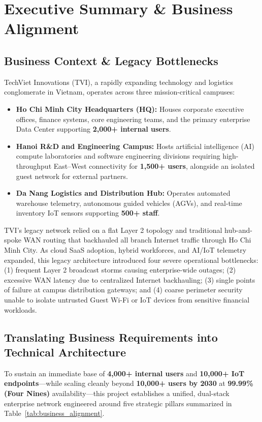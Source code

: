\section{Executive Summary \& Business Alignment}

\subsection{Business Context \& Legacy Bottlenecks}
TechViet Innovations (TVI), a rapidly expanding technology and logistics conglomerate in Vietnam, operates across three mission-critical campuses:
\begin{itemize}[leftmargin=1.5em, itemsep=3pt]
    \item \textbf{Ho Chi Minh City Headquarters (HQ):} Houses corporate executive offices, finance systems, core engineering teams, and the primary enterprise Data Center supporting \textbf{2,000+ internal users}.
    \item \textbf{Hanoi R\&D and Engineering Campus:} Hosts artificial intelligence (AI) compute laboratories and software engineering divisions requiring high-throughput East--West connectivity for \textbf{1,500+ users}, alongside an isolated guest network for external partners.
    \item \textbf{Da Nang Logistics and Distribution Hub:} Operates automated warehouse telemetry, autonomous guided vehicles (AGVs), and real-time inventory IoT sensors supporting \textbf{500+ staff}.
\end{itemize}

TVI's legacy network relied on a flat Layer 2 topology and traditional hub-and-spoke WAN routing that backhauled all branch Internet traffic through Ho Chi Minh City. As cloud SaaS adoption, hybrid workforces, and AI/IoT telemetry expanded, this legacy architecture introduced four severe operational bottlenecks: (1) frequent Layer 2 broadcast storms causing enterprise-wide outages; (2) excessive WAN latency due to centralized Internet backhauling; (3) single points of failure at campus distribution gateways; and (4) coarse perimeter security unable to isolate untrusted Guest Wi-Fi or IoT devices from sensitive financial workloads.

\subsection{Translating Business Requirements into Technical Architecture}
To sustain an immediate base of \textbf{4,000+ internal users} and \textbf{10,000+ IoT endpoints}---while scaling cleanly beyond \textbf{10,000+ users by 2030} at \textbf{99.99\% (Four Nines)} availability---this project establishes a unified, dual-stack enterprise network engineered around five strategic pillars summarized in Table~\ref{tab:business_alignment}.


